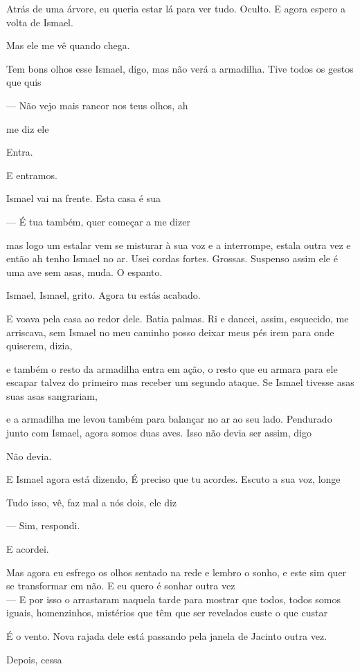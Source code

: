 Atrás de uma árvore, eu queria estar lá para ver tudo. Oculto. E agora
espero a volta de Ismael.

Mas ele me vê quando chega.

Tem bons olhos esse Ismael, digo, mas não verá a armadilha. Tive todos
os gestos que quis

--- Não vejo mais rancor nos teus olhos, ah

me diz ele

Entra.

E entramos.

Ismael vai na frente. Esta casa é sua

--- É tua também, quer começar a me dizer

mas logo um estalar vem se misturar à sua voz e a interrompe, estala
outra vez e então ah tenho Ismael no ar. Usei cordas fortes. Grossas.
Suspenso assim ele é uma ave sem asas, muda. O espanto.

Ismael, Ismael, grito. Agora tu estás acabado.

E voava pela casa ao redor dele. Batia palmas. Ri e dancei, assim,
esquecido, me arriscava, sem Ismael no meu caminho posso deixar meus pés
irem para onde quiserem, dizia,

e também o resto da armadilha entra em ação, o resto que eu armara para
ele escapar talvez do primeiro mas receber um segundo ataque. Se Ismael
tivesse asas suas asas sangrariam,

e a armadilha me levou também para balançar no ar ao seu lado. Pendurado
junto com Ismael, agora somos duas aves. Isso não devia ser assim, digo

Não devia.

E Ismael agora está dizendo, É preciso que tu acordes. Escuto a sua voz,
longe

Tudo isso, vê, faz mal a nós dois, ele diz

--- Sim, respondi.

E acordei.

Mas agora eu esfrego os olhos sentado na rede e lembro o sonho, e este
sim quer se transformar em não. E eu quero é sonhar outra vez\\

--- E por isso o arrastaram naquela tarde para mostrar que todos, todos
somos iguais, homenzinhos, mistérios que têm que ser revelados custe o
que custar

É o vento. Nova rajada dele está passando pela janela de Jacinto outra
vez.

Depois, cessa

